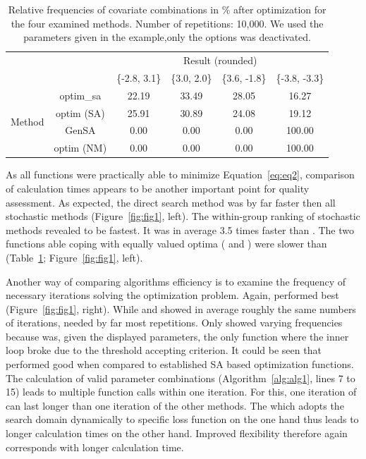 \begin{table}[]
\centering
\caption{Relative frequencies of covariate combinations in \% after optimization for the four examined methods. Number of repetitions: 10,000. We used the parameters given in the example,only the  options was deactivated.}
\label{tab:tab1}
\begin{tabular}{cccccc} \cline{3-6}
& \multicolumn{1}{c}{} & \multicolumn{4}{c}{Result (rounded)}                    \\ \cline{3-6} 
&                      & \{-2.8, 3.1\} & \{3.0, 2.0\} & \{3.6, -1.8\} & \{-3.8, -3.3\} \\ \cline{2-6} 
\multirow{4}{*}{Method} & optim\_sa          & 22.19     & 33.49    & 28.05     & 16.27      \\
& optim (SA)            & 25.91     & 30.89    & 24.08     & 19.12      \\
& GenSA              & 0.00      & 0.00     & 0.00      & 100.00     \\
& optim (NM)          & 0.00      & 0.00     & 0.00      & 100.00     \\ \cline{2-6} 
\end{tabular}
\end{table}

As all functions were practically able to minimize Equation~\eqref{eq:eq2}, comparison of calculation times appears to be another important point for quality assessment. As expected, the direct search method  was by far faster then all stochastic methods (Figure~\ref{fig:fig1}, left). The within-group ranking of stochastic methods revealed  to be fastest. It was in average 3.5 times faster than . The two functions able coping with equally valued optima ( and ) were slower than  (Table~\ref{tab:tab1}; Figure~\ref{fig:fig1}, left).

Another way of comparing algorithms efficiency is to examine the frequency of necessary iterations solving the optimization problem. Again,  performed best (Figure~\ref{fig:fig1}, right). While  and  showed in average roughly the same numbers of iterations,  needed by far most repetitions. Only  showed varying frequencies because  was, given the displayed parameters, the only function where the inner loop broke due to the threshold accepting criterion. It could be seen that  performed good when compared to established SA based optimization functions. The calculation of valid parameter combinations (Algorithm~\ref{alg:alg1}, lines 7 to 15) leads to multiple function calls within one iteration. For this, one iteration of  can last longer than one iteration of the other methods. The  which adopts the search domain dynamically to specific loss function on the one hand thus leads to longer calculation times on the other hand. Improved flexibility therefore again corresponds with longer calculation time.

